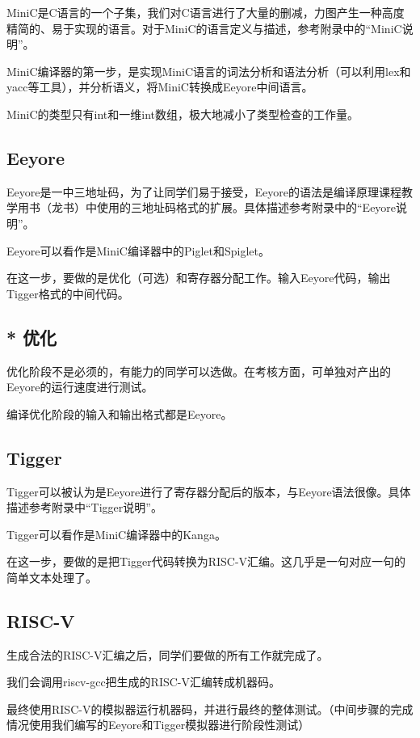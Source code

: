 \documentclass{ctexart}
\begin{document}
MiniC是C语言的一个子集，我们对C语言进行了大量的删减，力图产生一种高度精简的、易于实现的语言。对于MiniC的语言定义与描述，参考附录中的“MiniC说明”。

MiniC编译器的第一步，是实现MiniC语言的词法分析和语法分析（可以利用lex和yacc等工具），并分析语义，将MiniC转换成Eeyore中间语言。

MiniC的类型只有int和一维int数组，极大地减小了类型检查的工作量。

\subsection{Eeyore}

Eeyore是一中三地址码，为了让同学们易于接受，Eeyore的语法是编译原理课程教学用书（龙书）中使用的三地址码格式的扩展。具体描述参考附录中的“Eeyore说明”。

Eeyore可以看作是MiniC编译器中的Piglet和Spiglet。

在这一步，要做的是优化（可选）和寄存器分配工作。输入Eeyore代码，输出Tigger格式的中间代码。

\subsection{* 优化}

优化阶段不是必须的，有能力的同学可以选做。在考核方面，可单独对产出的Eeyore的运行速度进行测试。

编译优化阶段的输入和输出格式都是Eeyore。

\subsection{Tigger}

Tigger可以被认为是Eeyore进行了寄存器分配后的版本，与Eeyore语法很像。具体描述参考附录中“Tigger说明”。

Tigger可以看作是MiniC编译器中的Kanga。

在这一步，要做的是把Tigger代码转换为RISC-V汇编。这几乎是一句对应一句的简单文本处理了。

\subsection{RISC-V}

生成合法的RISC-V汇编之后，同学们要做的所有工作就完成了。

我们会调用riscv-gcc把生成的RISC-V汇编转成机器码。

最终使用RISC-V的模拟器运行机器码，并进行最终的整体测试。（中间步骤的完成情况使用我们编写的Eeyore和Tigger模拟器进行阶段性测试）
\end{document}
